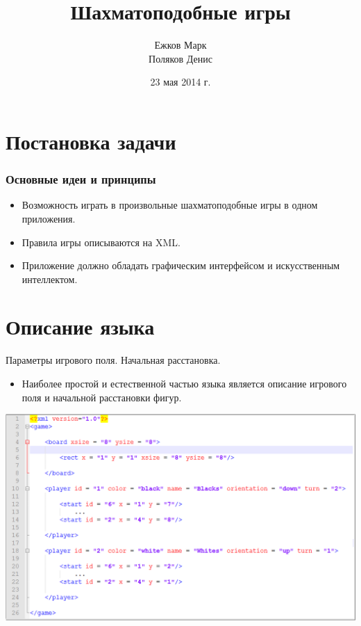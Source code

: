 \documentclass[11pt,slides,aspectratio=43]{beamer}
\title[]{Шахматоподобные игры}
\author[Ежков М. Поляков Д.]{Ежков Марк \\Поляков Денис}
\date{23 мая 2014 г.}
\begin{document}
	\begin{frame}
		\maketitle
	\end{frame}
	\section{Постановка задачи}	
	\begin{frame}
	\frametitle{Основные идеи и принципы}
	   \begin{block}{}
            \begin{itemize}
	           \item Возможность играть в произвольные шахматоподобные игры в одном приложения.
	           \item Правила игры описываются на XML.
               \item Приложение должно обладать графическим интерфейсом и искусственным интеллектом.
            \end{itemize}
		\end{block}
	\end{frame}
	
	\section{Описание языка}%
	\begin{frame}{Параметры игрового поля. Начальная расстановка.}
		\begin{block}{}
            \begin{itemize}
	           \item Наиболее простой и естественной частью языка является описание игрового поля и начальной расстановки фигур.
            \end{itemize}
            \begin{center}
			     \includegraphics[scale=0.33]{gameBoard.png}
		    \end{center}
		\end{block}
	\end{frame}
\end{document}
